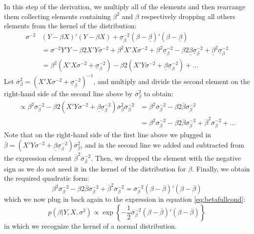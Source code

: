 \documentclass[
  letterpaper,
  DIV=11,
  numbers=noendperiod]{scrreprt}
\begin{document}
In this step of the derivation, we multiply all of the elements and then
rearrange them collecting elements containing \(\beta^2\) and \(\beta\)
respectively dropping all others elements from the kernel of the
distribution: \begin{align} 
\sigma^{-2}&(Y-\beta X)'(Y-\beta X) + \underline{\sigma}_{\beta}^{-2}(\beta-\underline{\beta})'(\beta-\underline{\beta}) \\
&= \sigma^{-2}Y'Y -\beta2X'Y\sigma^{-2} + \beta^2X'X\sigma^{-2} + \beta^2\underline{\sigma}_{\beta}^{-2} - \beta2\underline{\beta}\underline{\sigma}_{\beta}^{-2}+ \underline{\beta}^{2}\underline{\sigma}_{\beta}^{-2}\\
&= \beta^2\left(X'X\sigma^{-2} + \underline{\sigma}_{\beta}^{-2}\right) - \beta2\left(X'Y\sigma^{-2} + \underline{\beta}\underline{\sigma}_{\beta}^{-2}\right) + \dots
\end{align} Let
\(\overline{\sigma}_{\beta}^2=\left(X'X\sigma^{-2} + \underline{\sigma}_{\beta}^{-2}\right)^{-1}\),
and multiply and divide the second element on the right-hand side of the
second line above by \(\overline{\sigma}_{\beta}^2\) to obtain:
\begin{align} 
\propto \beta^2\overline{\sigma}_{\beta}^{-2} - \beta2\left(X'Y\sigma^{-2} + \underline{\beta}\underline{\sigma}_{\beta}^{-2}\right)\overline{\sigma}_{\beta}^2 \overline{\sigma}_{\beta}^{-2} 
&= \beta^2\overline{\sigma}_{\beta}^{-2} - \beta2 \overline{\beta} \overline{\sigma}_{\beta}^{-2}\\
&= \beta^2\overline{\sigma}_{\beta}^{-2} - \beta2 \overline{\beta} \overline{\sigma}_{\beta}^{-2} + \overline{\beta}^2\overline{\sigma}_{\beta}^{-2} + \dots
\end{align} Note that on the right-hand side of the first line above we
plugged in
\(\overline{\beta} = \left(X'Y\sigma^{-2} + \underline{\beta}\underline{\sigma}_{\beta}^{-2}\right)\overline{\sigma}_{\beta}^2\),
and in the second line we added and subtracted from the expression
element \(\overline{\beta}^2\overline{\sigma}_{\beta}^{-2}\). Then, we
dropped the element with the negative sign as we do not need it in the
kernel of the distribution for \(\beta\). Finally, we obtain the
required quadratic form: \begin{equation} 
\beta^2\overline{\sigma}_{\beta}^{-2} - \beta2 \overline{\beta} \overline{\sigma}_{\beta}^{-2} + \overline{\beta}^2\overline{\sigma}_{\beta}^{-2} = \overline{\sigma}_{\beta}^{-2}(\beta-\overline{\beta})'(\beta-\overline{\beta})
\end{equation} which we now plug in back again to the expression in
equation \eqref{eq:betafullcond}: \begin{equation} 
p\left(\beta|Y,X,\sigma^2\right) \propto  \exp\left\{ -\frac{1}{2}\overline{\sigma}_{\beta}^{-2}(\beta-\overline{\beta})'(\beta-\overline{\beta})\right\}
\end{equation} in which we recognize the kernel of a normal
distribution.
\end{document}
